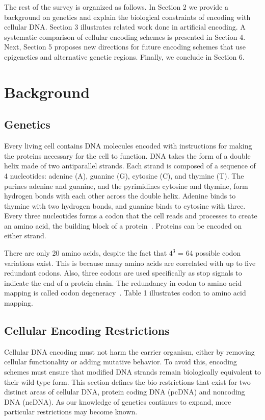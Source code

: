 \documentclass{bioinfo}
\begin{document}
The rest of the survey is organized as follows. In Section 2 we provide a background on genetics and explain the biological constraints of encoding with cellular DNA. Section 3  illustrates related work done in artificial encoding. A systematic comparison of cellular encoding schemes is presented in Section 4. Next, Section 5 proposes new directions for future encoding schemes that use epigenetics and alternative genetic regions. Finally, we conclude in Section 6.


\section{Background}

\subsection{Genetics}

Every living cell contains DNA molecules encoded with instructions for making the proteins necessary for the cell to function. DNA takes the form of a double helix made of two antiparallel strands. Each strand is composed of a sequence of 4 nucleotides: adenine (A), guanine (G), cytosine (C), and thymine (T). The purines adenine and guanine, and the pyrimidines cytosine and thymine, form hydrogen bonds with each other across the double helix. Adenine binds to thymine with two hydrogen bonds, and guanine binds to cytosine with three. Every three nucleotides forms a codon that the cell reads and processes to create an amino acid, the building block of a protein~\cite{WC1953N}. Proteins can be encoded on either strand.

There are only 20 amino acids, despite the fact that $4^3$ = 64 possible codon variations exist. This is because many amino acids are correlated with up to five redundant codons. Also, three codons are used specifically as stop signals to indicate the end of a protein chain. The redundancy in codon to amino acid mapping is called codon degeneracy~\cite{WBBGLL2008}. Table 1 illustrates codon to amino acid mapping.


\subsection{Cellular Encoding Restrictions}

Cellular DNA encoding must not harm the carrier organism, either by removing cellular functionality or adding mutative behavior. To avoid this, encoding schemes must ensure that modified DNA strands remain biologically equivalent to their wild-type form. This section defines the bio-restrictions that exist for two distinct areas of cellular DNA, protein coding DNA (pcDNA) and noncoding DNA (ncDNA). As our knowledge of genetics continues to expand, more particular restrictions may become known.
\end{document}
